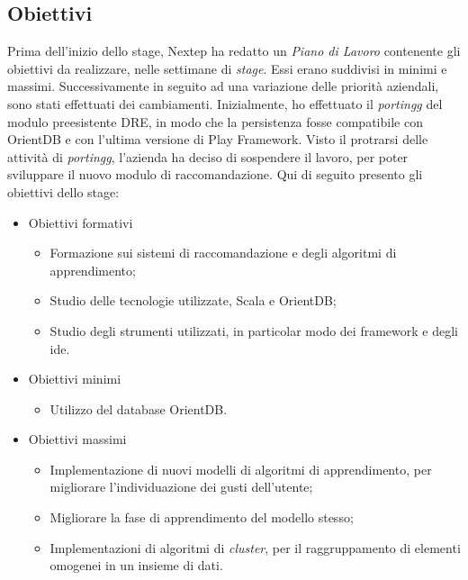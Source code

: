 \subsection{Obiettivi}
Prima dell'inizio dello stage, Nextep ha redatto un \emph{Piano di Lavoro} contenente gli obiettivi da realizzare, nelle settimane di \emph{stage}. Essi erano suddivisi in minimi e massimi. Successivamente in seguito ad una variazione delle priorità aziendali, sono stati effettuati dei cambiamenti. Inizialmente, ho effettuato il \emph{\gls{portingg}} del modulo preesistente DRE, in modo che la persistenza fosse compatibile con OrientDB e con l'ultima versione di Play Framework. Visto il protrarsi delle attività di \emph{\gls{portingg}}, l'azienda ha deciso di sospendere il lavoro, per poter sviluppare il nuovo modulo di raccomandazione.
\newpage
Qui di seguito presento gli obiettivi dello stage:
\begin{itemize}
\item Obiettivi formativi
\begin{itemize}
\item Formazione sui sistemi di raccomandazione e degli algoritmi di apprendimento;
\item Studio delle tecnologie utilizzate, Scala e OrientDB;
\item Studio degli strumenti utilizzati, in particolar modo dei \gls{framework} e degli \gls{ide}.
\end{itemize}
\item Obiettivi minimi
\begin{itemize}
\item Utilizzo del database OrientDB.
\end{itemize}
\item Obiettivi massimi
\begin{itemize}
\item Implementazione di nuovi modelli di algoritmi di apprendimento, per migliorare l'individuazione dei gusti dell'utente;
\item Migliorare la fase di apprendimento del modello stesso;
\item Implementazioni di algoritmi di \emph{cluster}, per il raggruppamento di elementi omogenei in un insieme di dati.
\end{itemize}
\end{itemize}




